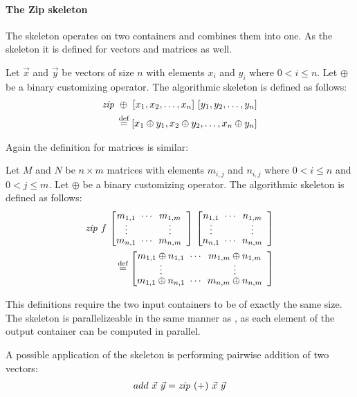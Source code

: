 \paragraph{The Zip skeleton}
The \zip skeleton operates on two containers and combines them into one.
As the \map skeleton it is defined for vectors and matrices as well.
\begin{definition}
  \label{definition:zip}
  Let $\vec{x}$ and $\vec{y}$ be vectors of size $n$ with elements $x_i$ and $y_i$ where $0 < i \leq n$.
  Let $\oplus$ be a binary customizing operator.
  The algorithmic skeleton \zip is defined as follows:
  \begin{equation*}
    \begin{split}
      \text{\textit{zip}}\ \oplus\ [x_1, x_2, \dots, x_n]\ [y_1, y_2, \dots, y_n]\\
      \stackrel{\textrm{\scriptsize def}}{=} [x_1 \oplus y_1, x_2 \oplus y_2, \dots, x_n \oplus y_n]
    \end{split}
  \end{equation*}
\end{definition}
\noindent
Again the definition for matrices is similar:
\begin{definition}
  \label{definition:zip:matrix}
  Let $M$ and $N$ be $n\times m$ matrices with elements $m_{i,j}$ and $n_{i,j}$ where $0 < i \leq n$ and $0 < j \leq m$.
  Let $\oplus$ be a binary customizing operator.
  The algorithmic skeleton \zip is defined as follows:
  \begin{equation*}
    \begin{split}
      \zip\ f\ {\DottedMatrix{m_{1,1}}{m_{1,m}}{m_{n,1}}{m_{n,m}}}\
            {\DottedMatrix{n_{1,1}}{n_{1,m}}{n_{n,1}}{n_{n,m}}} \\
      \eqdef \DottedMatrix{m_{1,1} \oplus n_{1,1}}{m_{1,m} \oplus n_{1,m}}{m_{1,1} \oplus n_{n,1}}{m_{n,m} \oplus n_{n,m}}
    \end{split}
  \end{equation*}
\end{definition}
\noindent
This definitions require the two input containers to be of exactly the same size.
The \zip skeleton is parallelizeable in the same manner as \map, as each element of the output container can be computed in parallel.

A possible application of the \zip skeleton is performing pairwise addition of two vectors:
\begin{align*}
  add\ \vec{x}\ \vec{y} = \text{\textit{zip}}\ (+)\ \vec{x}\ \vec{y}
\end{align*}



